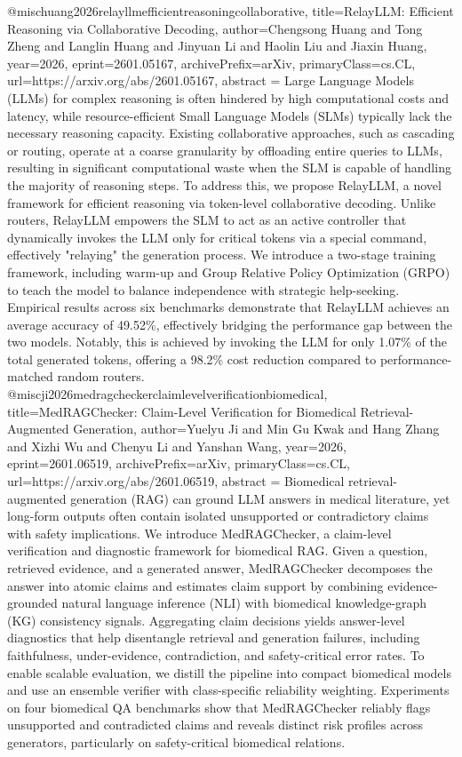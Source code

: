 {}@misc{huang2026relayllmefficientreasoningcollaborative,
      title={RelayLLM: Efficient Reasoning via Collaborative Decoding}, 
      author={Chengsong Huang and Tong Zheng and Langlin Huang and Jinyuan Li and Haolin Liu and Jiaxin Huang},
      year={2026},
      eprint={2601.05167},
      archivePrefix={arXiv},
      primaryClass={cs.CL},
      url={https://arxiv.org/abs/2601.05167},
      abstract = {Large Language Models (LLMs) for complex reasoning is often hindered by high computational costs and latency, while resource-efficient Small Language Models (SLMs) typically lack the necessary reasoning capacity. Existing collaborative approaches, such as cascading or routing, operate at a coarse granularity by offloading entire queries to LLMs, resulting in significant computational waste when the SLM is capable of handling the majority of reasoning steps. To address this, we propose RelayLLM, a novel framework for efficient reasoning via token-level collaborative decoding. Unlike routers, RelayLLM empowers the SLM to act as an active controller that dynamically invokes the LLM only for critical tokens via a special command, effectively "relaying" the generation process. We introduce a two-stage training framework, including warm-up and Group Relative Policy Optimization (GRPO) to teach the model to balance independence with strategic help-seeking. Empirical results across six benchmarks demonstrate that RelayLLM achieves an average accuracy of 49.52\%, effectively bridging the performance gap between the two models. Notably, this is achieved by invoking the LLM for only 1.07\% of the total generated tokens, offering a 98.2\% cost reduction compared to performance-matched random routers.}
}@misc{ji2026medragcheckerclaimlevelverificationbiomedical,
      title={MedRAGChecker: Claim-Level Verification for Biomedical Retrieval-Augmented Generation}, 
      author={Yuelyu Ji and Min Gu Kwak and Hang Zhang and Xizhi Wu and Chenyu Li and Yanshan Wang},
      year={2026},
      eprint={2601.06519},
      archivePrefix={arXiv},
      primaryClass={cs.CL},
      url={https://arxiv.org/abs/2601.06519},
      abstract = {Biomedical retrieval-augmented generation (RAG) can ground LLM answers in medical literature, yet long-form outputs often contain isolated unsupported or contradictory claims with safety implications.   We introduce MedRAGChecker, a claim-level verification and diagnostic framework for biomedical RAG.   Given a question, retrieved evidence, and a generated answer, MedRAGChecker decomposes the answer into atomic claims and estimates claim support by combining evidence-grounded natural language inference (NLI) with biomedical knowledge-graph (KG) consistency signals.   Aggregating claim decisions yields answer-level diagnostics that help disentangle retrieval and generation failures, including faithfulness, under-evidence, contradiction, and safety-critical error rates.   To enable scalable evaluation, we distill the pipeline into compact biomedical models and use an ensemble verifier with class-specific reliability weighting.   Experiments on four biomedical QA benchmarks show that MedRAGChecker reliably flags unsupported and contradicted claims and reveals distinct risk profiles across generators, particularly on safety-critical biomedical relations.}
}
